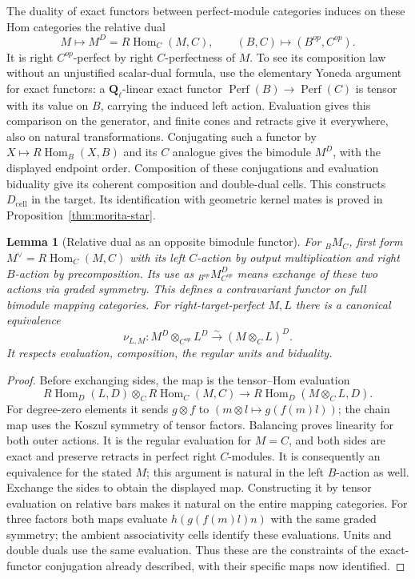 \documentclass[11pt]{article}
\newtheorem{lemma}[proposition]{Lemma}
\theoremstyle{definition}
\theoremstyle{remark}
\newcommand{\Q}{\mathbf Q_\ell}
\newcommand{\RHom}{R\operatorname{Hom}}
\newcommand{\Perf}{\operatorname{Perf}}
\begin{document}
The duality of exact functors between perfect-module categories
induces on these Hom categories the relative dual
\[
 M\longmapsto M^D=\RHom_C(M,C),
 \qquad (B,C)\longmapsto(B^{op},C^{op}).
\]
It is right $C^{op}$-perfect by right $C$-perfectness of $M$.
To see its composition law without an unjustified scalar-dual
formula, use the elementary Yoneda argument for exact functors:
a $\Q$-linear exact functor $\Perf(B)\to\Perf(C)$ is tensor with its value on
$B$, carrying the induced left action.  Evaluation gives this
comparison on the generator, and finite cones and retracts give it
everywhere, also on natural transformations.  Conjugating such a
functor by $X\mapsto\RHom_B(X,B)$ and its $C$ analogue gives the
bimodule $M^D$, with the displayed endpoint order.  Composition of
these conjugations and evaluation biduality give its coherent
composition and double-dual cells.  This constructs $D_{\mathrm{cell}}$
in the target.  Its identification with geometric kernel mates is
proved in Proposition~\ref{thm:morita-star}.

\begin{lemma}[Relative dual as an opposite bimodule functor]
\label{lem:morita-opposite-dual}
For ${}_BM_C$, first form $M^\vee=\RHom_C(M,C)$ with its
left $C$-action by output multiplication and right $B$-action by
precomposition.  Its use as ${}_{B^{op}}M^D_{C^{op}}$ means exchange
of these two actions via graded symmetry.  This defines a
contravariant functor on full bimodule mapping categories.  For
right-target-perfect $M,L$ there is a canonical equivalence
\begin{equation}
 \nu_{L,M}:M^D\otimes_{C^{op}}L^D
       \xrightarrow{\sim}(M\otimes_C L)^D .
 \label{eq:relative-dual-composition}
\end{equation}
It respects evaluation, composition, the regular units and biduality.
\end{lemma}
\begin{proof}
Before exchanging sides, the map is the tensor--Hom evaluation
\[
 \RHom_D(L,D)\otimes_C\RHom_C(M,C)
       \longrightarrow\RHom_D(M\otimes_C L,D).
\]
For degree-zero elements it sends $g\otimes f$ to
$(m\otimes l\mapsto g(f(m)l))$; the chain map uses the Koszul
symmetry of tensor factors.  Balancing proves linearity for both
outer actions.  It is the regular evaluation for $M=C$, and both
sides are exact and preserve retracts in perfect right $C$-modules.
It is consequently an equivalence for the stated $M$; this argument
is natural in the left $B$-action as well.  Exchange the sides to
obtain the displayed map.  Constructing it by tensor evaluation on
relative bars makes it natural on the entire mapping categories.
For three factors both maps evaluate $h(g(f(m)l)n)$ with the same
graded symmetry; the ambient associativity cells identify these
evaluations.  Units and double duals use the same evaluation.
Thus these are the constraints of the exact-functor conjugation
already described, with their specific maps now identified.
\end{proof}
\end{document}

